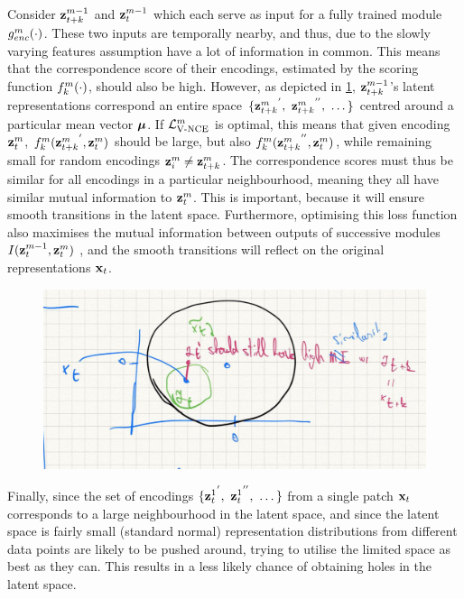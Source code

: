 			Consider $\mathbf{z}_{t+k}^{m-1}$ and $\mathbf{z}_t^{m-1}$ which each serve as input for a fully trained module $g_{enc}^m(\cdot)$. These two inputs are temporally nearby, and thus, due to the slowly varying features assumption \cite{zhangSlowFeatureAnalysis2012} have a lot of information in common. This means that the correspondence score of their encodings, estimated by the scoring function $f_k^m(\cdot)$, should also be high. However, as depicted in \ref{fig:gaussian-neighbourhood}, $\mathbf{z}_{t+k}^{m-1}$'s latent representations correspond an entire space $ \{ {\mathbf{z}_{t+k}^m}^{'},~{\mathbf{z}_{t+k}^m}^{''},~\dots \}$ centred around a particular mean vector $\bm{\mu}$. If $\mathcal{L}_{\text{V-NCE}}^m$ is optimal, this means that given encoding $\mathbf{z}_t^m$, $f_k^m({\mathbf{z}_{t+k}^m}^{'}, {\mathbf{z}_t^m})$ should be  large, but also $f_k^m({\mathbf{z}_{t+k}^m}^{''}, {\mathbf{z}_t^m})$, while remaining small for random encodings $\mathbf{z}_i^m \neq \mathbf{z}_{t+k}^m$. The correspondence scores must thus be similar for all encodings in a particular neighbourhood, meaning they all have similar mutual information to $\mathbf{z}_t^{m}$. This is important, because it will ensure smooth transitions in the latent space. Furthermore, optimising this loss function also maximises the mutual information between outputs of successive modules $I(\mathbf{z}_t^{m-1}, \mathbf{z}_t^{m})$ \cite{lowePuttingEndEndtoEnd2020}, and the smooth transitions will reflect on the original representations $\mathbf{x}_t$.			 
		
		\begin{figure} %
			\centering
			\includegraphics[width=0.7\linewidth]{"gaussian neighbourhood"}
			\caption{}
			\label{fig:gaussian-neighbourhood}
		\end{figure}
		
			Finally, since the set of encodings $ \{ {\mathbf{z}_t^1}^{'},~{\mathbf{z}_t^1}^{''},~\dots \}$ from a single patch $\mathbf{x}_t$ corresponds to a large neighbourhood in the latent space, and since the latent space is fairly small (standard normal) representation distributions from different data points are likely to be pushed around, trying to utilise the limited space as best as they can. This results in a less likely chance of obtaining holes in the latent space.
			
